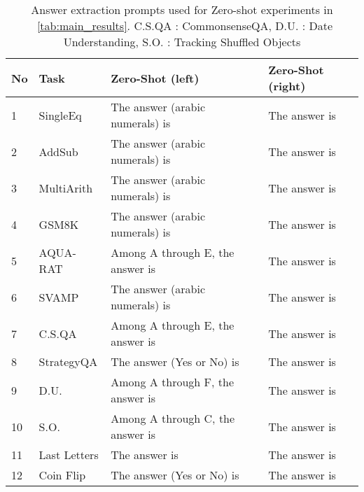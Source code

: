 \documentclass{article}
\newcommand{\theirsz}{Zero-shot\xspace}
\begin{document}
\begin{table}[h]\centering
\caption{Answer extraction prompts used for \theirsz experiments in ~\autoref{tab:main_results}. C.S.QA : CommonsenseQA, D.U. : Date Understanding, S.O. : Tracking Shuffled Objects}
\label{tab:answer_prompts_1}
\begin{tabular}{p{}p{}p{}p{}}
\toprule
No &Task &Zero-Shot (left) &Zero-Shot (right) \\

\midrule

1 &SingleEq &The answer (arabic numerals) is &The answer is \\
2 &AddSub &The answer (arabic numerals) is &The answer is \\
3 &MultiArith &The answer (arabic numerals) is &The answer is \\
4 &GSM8K &The answer (arabic numerals) is &The answer is \\
5 &AQUA-RAT &Among A through E, the answer is &The answer is \\
6 &SVAMP &The answer (arabic numerals) is &The answer is \\
7 &C.S.QA &Among A through E, the answer is &The answer is \\
8 &StrategyQA &The answer (Yes or No) is &The answer is \\
9 &D.U. &Among A through F, the answer is &The answer is \\
10 &S.O. &Among A through C, the answer is &The answer is \\
11 &Last Letters &The answer is &The answer is \\
12 &Coin Flip &The answer (Yes or No) is &The answer is \\
\bottomrule
\end{tabular}
\end{table}
\end{document}
